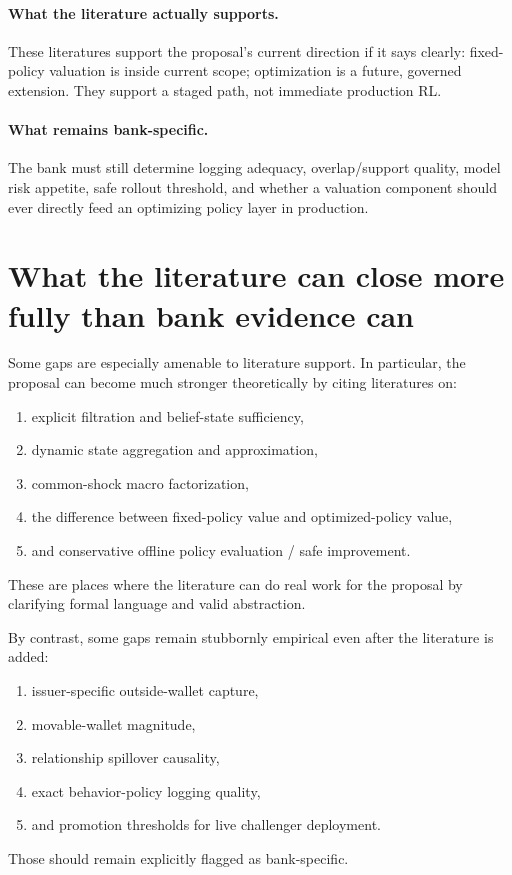 \documentclass[11pt]{article}
\begin{document}
\paragraph{What the literature actually supports.}
These literatures support the proposal's current direction if it says clearly:
fixed-policy valuation is inside current scope; optimization is a future,
governed extension. They support a staged path, not immediate production RL.

\paragraph{What remains bank-specific.}
The bank must still determine logging adequacy, overlap/support quality, model
risk appetite, safe rollout threshold, and whether a valuation component should
ever directly feed an optimizing policy layer in production.

\section{What the literature can close more fully than bank evidence can}

Some gaps are especially amenable to literature support. In particular, the
proposal can become much stronger theoretically by citing literatures on:
\begin{enumerate}[label=\arabic*.]
  \item explicit filtration and belief-state sufficiency,
  \item dynamic state aggregation and approximation,
  \item common-shock macro factorization,
  \item the difference between fixed-policy value and optimized-policy value,
  \item and conservative offline policy evaluation / safe improvement.
\end{enumerate}
These are places where the literature can do real work for the proposal by
clarifying formal language and valid abstraction.

By contrast, some gaps remain stubbornly empirical even after the literature is
added:
\begin{enumerate}[label=\arabic*.]
  \item issuer-specific outside-wallet capture,
  \item movable-wallet magnitude,
  \item relationship spillover causality,
  \item exact behavior-policy logging quality,
  \item and promotion thresholds for live challenger deployment.
\end{enumerate}
Those should remain explicitly flagged as bank-specific.
\end{document}

